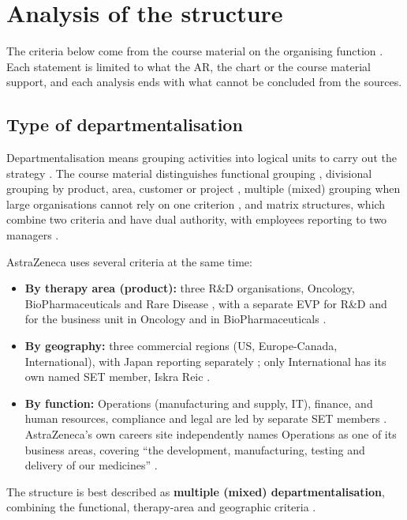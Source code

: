 \section{Analysis of the structure}

The criteria below come from the course material on the organising function \cite{ORG}. Each statement is limited to what the AR, the chart or the course material support, and each analysis ends with what cannot be concluded from the sources.

\subsection{Type of departmentalisation}

Departmentalisation means grouping activities into logical units to carry out the strategy \cite[p.~14]{ORG}. The course material distinguishes functional grouping \cite[p.~15]{ORG}, divisional grouping by product, area, customer or project \cite[pp.~16--19]{ORG}, multiple (mixed) grouping when large organisations cannot rely on one criterion \cite[p.~20]{ORG}, and matrix structures, which combine two criteria and have dual authority, with employees reporting to two managers \cite[pp.~21--22]{ORG}.

AstraZeneca uses several criteria at the same time:

\begin{itemize}
\item \textbf{By therapy area (product):} three R\&D organisations, Oncology, BioPharmaceuticals and Rare Disease \cite[p.~26]{AR}, with a separate EVP for R\&D and for the business unit in Oncology and in BioPharmaceuticals \cite[p.~70]{AR}.
\item \textbf{By geography:} three commercial regions (US, Europe-Canada, International), with Japan reporting separately \cite[p.~32]{AR}; only International has its own named SET member, Iskra Reic \cite[p.~70]{AR}.
\item \textbf{By function:} Operations (manufacturing and supply, IT), finance, and human resources, compliance and legal are led by separate SET members \cite[p.~70]{AR}. AstraZeneca's own careers site independently names Operations as one of its business areas, covering ``the development, manufacturing, testing and delivery of our medicines'' \cite{CAREERS}.
\end{itemize}

\begin{analysis}
The structure is best described as \textbf{multiple (mixed) departmentalisation}, combining the functional, therapy-area and geographic criteria \cite[p.~20]{ORG}.
\end{analysis}


